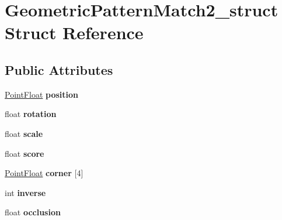 \hypertarget{structGeometricPatternMatch2__struct}{\section{\-Geometric\-Pattern\-Match2\-\_\-struct \-Struct \-Reference}
\label{structGeometricPatternMatch2__struct}
}
\subsection*{\-Public \-Attributes}
\begin{DoxyCompactItemize}
\item 
\hypertarget{structGeometricPatternMatch2__struct_a197646db066aac408c3dd50662664afc}{\hyperlink{structPointFloat__struct}{\-Point\-Float} {\bfseries position}}\label{structGeometricPatternMatch2__struct_a197646db066aac408c3dd50662664afc}

\item 
\hypertarget{structGeometricPatternMatch2__struct_a0eb2e4974c7d011dc437797d251a2bfb}{float {\bfseries rotation}}\label{structGeometricPatternMatch2__struct_a0eb2e4974c7d011dc437797d251a2bfb}

\item 
\hypertarget{structGeometricPatternMatch2__struct_a458223db8c39fdc0062671887d1a883e}{float {\bfseries scale}}\label{structGeometricPatternMatch2__struct_a458223db8c39fdc0062671887d1a883e}

\item 
\hypertarget{structGeometricPatternMatch2__struct_ae58b9b6a3ca19838279696601c0025f9}{float {\bfseries score}}\label{structGeometricPatternMatch2__struct_ae58b9b6a3ca19838279696601c0025f9}

\item 
\hypertarget{structGeometricPatternMatch2__struct_ab112c1bb1b39eb7263b2723a9bd37c32}{\hyperlink{structPointFloat__struct}{\-Point\-Float} {\bfseries corner} \mbox{[}4\mbox{]}}\label{structGeometricPatternMatch2__struct_ab112c1bb1b39eb7263b2723a9bd37c32}

\item 
\hypertarget{structGeometricPatternMatch2__struct_a231cf434fd9b5f5c6dd67d9e1f8280c1}{int {\bfseries inverse}}\label{structGeometricPatternMatch2__struct_a231cf434fd9b5f5c6dd67d9e1f8280c1}

\item 
\hypertarget{structGeometricPatternMatch2__struct_afe5c6d97465e14aa2ed80a17a2df4531}{float {\bfseries occlusion}}\label{structGeometricPatternMatch2__struct_afe5c6d97465e14aa2ed80a17a2df4531}


\end{DoxyCompactItemize}
